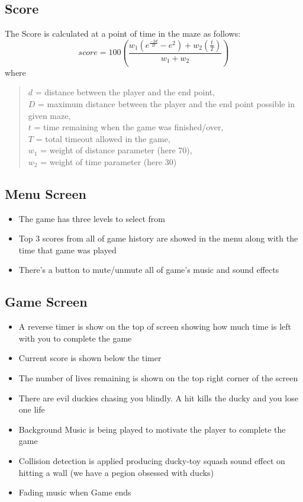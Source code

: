 \documentclass{article}
\begin{document}
\subsection*{Score}
The Score is calculated at a point of time in the maze as follows:
\begin{equation}
    score = 100 \left( \frac{w_1\left(e^{\frac{-2d}{D}}-e^2\right)+w_2\left(\frac{t}{T}\right)}{w_1+w_2} \right)
\end{equation}
where 
\begin{verse}
    $d$ = distance between the player and the end point,\\
    $D$ = maximum distance between the player and the end point possible in given maze,\\
    $t$ = time remaining when the game was finished/over,\\
    $T$ = total timeout allowed in the game,\\
    $w_1$ = weight of distance parameter (here 70),\\
    $w_2$ = weight of time parameter (here 30)
\end{verse}

\subsection{Menu Screen}
\begin{itemize}
    \item The game has three levels to select from
    \item Top 3 scores from all of game history are showed in the menu along with the time that game was played
    \item There's a button to mute/unmute all of game's music and sound effects
\end{itemize}
\subsection{Game Screen}
\begin{itemize}
    \item A reverse timer is show on the top of screen showing how much time is left with you to complete the game
    \item Current score is shown below the timer
    \item The number of lives remaining is shown on the top right corner of the screen
    \item There are evil duckies chasing you blindly. A hit kills the ducky and you lose one life
    \item Background Music is being played to motivate the player to complete the game
    \item Collision detection is applied producing ducky-toy squash sound effect on hitting a wall (we have a pegion obsessed with ducks)
    \item Fading music when Game ends
\end{itemize}
\end{document}
